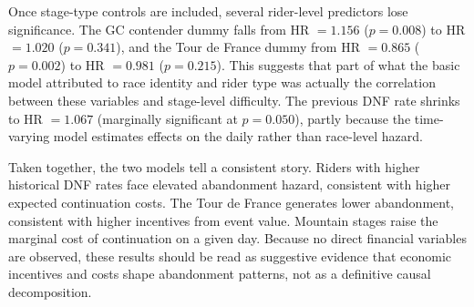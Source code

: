 Once stage-type controls are included, several rider-level predictors lose significance. The GC contender dummy falls from HR $= 1.156$ ($p = 0.008$) to HR $= 1.020$ ($p = 0.341$), and the Tour de France dummy from HR $= 0.865$ ($p = 0.002$) to HR $= 0.981$ ($p = 0.215$). This suggests that part of what the basic model attributed to race identity and rider type was actually the correlation between these variables and stage-level difficulty. The previous DNF rate shrinks to HR $= 1.067$ (marginally significant at $p = 0.050$), partly because the time-varying model estimates effects on the daily rather than race-level hazard.

Taken together, the two models tell a consistent story. Riders with higher historical DNF rates face elevated abandonment hazard, consistent with higher expected continuation costs. The Tour de France generates lower abandonment, consistent with higher incentives from event value. Mountain stages raise the marginal cost of continuation on a given day. Because no direct financial variables are observed, these results should be read as suggestive evidence that economic incentives and costs shape abandonment patterns, not as a definitive causal decomposition.
